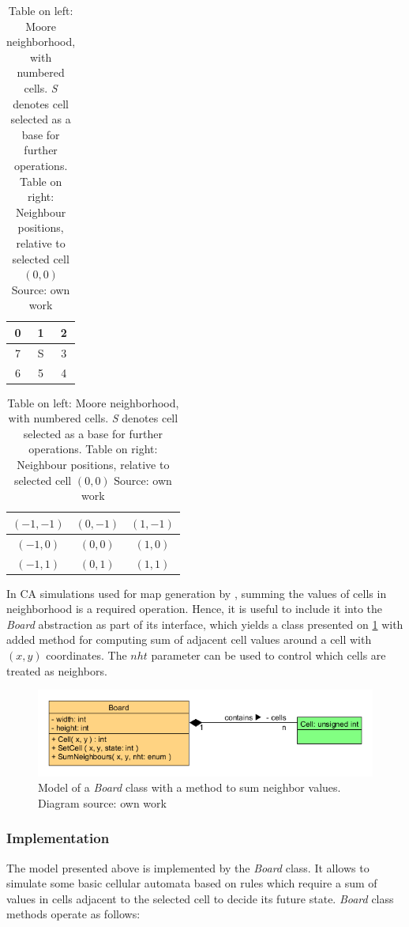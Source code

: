 \documentclass[12pt]{report}
\begin{document}
\begin{table}[h] 
	\centering 
	\begin{tabular}{| c | c | c |}\hline 
		0 & 1 & 2 \\ \hline
		7 & S & 3 \\ \hline
		6 & 5 & 4 \\ \hline
	\end{tabular} 
	\begin{tabular}{| c | c | c |}\hline 
		$(-1,-1)$ & $( 0,-1)$ & $( 1,-1)$ \\ \hline
		$(-1, 0)$ & $( 0, 0)$ & $( 1, 0)$ \\ \hline
		$(-1, 1)$ & $( 0, 1)$ & $( 1, 1)$ \\ \hline
	\end{tabular} 
	\caption{Table on left: Moore neighborhood, with numbered cells. \textit{S} denotes cell selected as a base for further operations. Table on right: Neighbour positions, relative to selected cell $(0,0)$ Source: own work}
	\label{tab:cellneighbors}
\end{table}

In CA simulations used for map generation by \autocite{johnson2010cellular}, summing the values of cells in neighborhood is a required operation. Hence, it is useful to include it into the \textit{Board} abstraction as part of its interface, which yields a class presented on \cref{fig:boardcell2} with added method for computing sum of adjacent cell values around a cell with $(x,y)$ coordinates. The $nht$ parameter can be used to control which cells are treated as neighbors.

\begin{figure}[H]
	\centering
	\includegraphics[width=0.8\linewidth]{diagrams/boardcell02}
	\caption{Model of a \textit{Board} class with a method to sum neighbor values. Diagram source: own work} 
	\label{fig:boardcell2}
\end{figure} 

\subsubsection{Implementation}
 
The model presented above is implemented by the \textit{Board} class. It allows to simulate some basic cellular automata based on rules which require a sum of values in cells adjacent to the selected cell to decide its future state. \textit{Board} class methods operate as follows:
\end{document}
